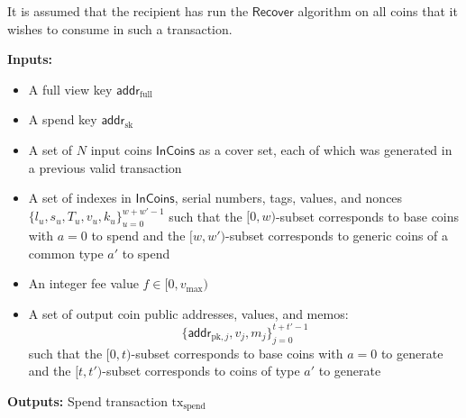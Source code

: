 \documentclass{article}
\newcommand{\func}[1]{\mathsf{#1}}
\newcommand{\addr}{\func{addr}}
\begin{document}
It is assumed that the recipient has run the $\func{Recover}$ algorithm on all coins that it wishes to consume in such a transaction.

\textbf{Inputs:}
\begin{itemize}
    \item A full view key $\addr_{\text{full}}$
    \item A spend key $\addr_{\text{sk}}$
    \item A set of $N$ input coins $\func{InCoins}$ as a cover set, each of which was generated in a previous valid transaction
    \item A set of indexes in $\func{InCoins}$, serial numbers, tags, values, and nonces $\{l_u, s_u, T_u, v_u, k_u\}_{u=0}^{w+w'-1}$ such that the $[0, w)$-subset corresponds to base coins with $a = 0$ to spend and the $[w, w')$-subset corresponds to generic coins of a common type $a'$ to spend
    \item An integer fee value $f \in [0,v_{\text{max}})$
    \item A set of output coin public addresses, values, and memos: $$\{\addr_{\text{pk},j}, v_j, m_j\}_{j=0}^{t+t'-1}$$ such that the $[0, t)$-subset corresponds to base coins with $a = 0$ to generate and the $[t, t')$-subset corresponds to coins of type $a'$ to generate
\end{itemize}

\textbf{Outputs:} Spend transaction $\text{tx}_{\text{spend}}$
\end{document}
